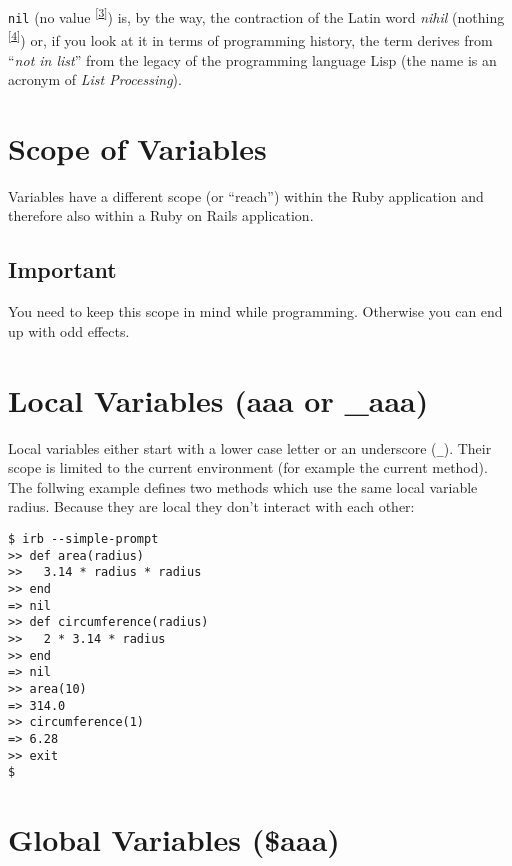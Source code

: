 \documentclass[a4paper]{book}
\begin{document}
\texttt{nil} (no value \textsuperscript{{[}\hyperref[ftn.idp2283568]{3}{]}}) is, by the way, the contraction of the Latin word \emph{nihil} (nothing \textsuperscript{{[}\hyperref[ftn.idp2285664]{4}{]}}) or, if you look at it in terms of programming history, the term derives from “\emph{not in list}” from the legacy of the programming language Lisp (the name is an acronym of \emph{List Processing}).

\section{Scope of Variables}\label{scope-of-variables}

Variables have a different scope (or “reach”) within the Ruby application and therefore also within a Ruby on Rails application.

\subsection{Important}\label{important-2}

You need to keep this scope in mind while programming. Otherwise you can end up with odd effects.

\section{Local Variables (aaa or \_aaa)}\label{local-variables-aaa-or-ux5faaa}

Local variables either start with a lower case letter or an underscore (\texttt{\_}). Their scope is limited to the current environment (for example the current method). The follwing example defines two methods which use the same local variable radius. Because they are local they don't interact with each other:

\begin{shaded}\begin{verbatim}
$ irb --simple-prompt
>> def area(radius)
>>   3.14 * radius * radius
>> end
=> nil
>> def circumference(radius)
>>   2 * 3.14 * radius
>> end
=> nil
>> area(10)
=> 314.0
>> circumference(1)
=> 6.28
>> exit
$
\end{verbatim}\end{shaded}

\section{Global Variables (\$aaa)}\label{global-variables-aaa}
\end{document}
